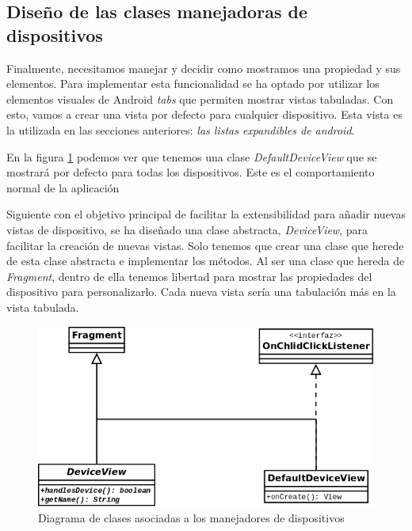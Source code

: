 \newpage
\subsection{Diseño de las clases manejadoras de dispositivos}

Finalmente, necesitamos manejar y decidir como mostramos una propiedad y sus elementos. Para implementar esta funcionalidad se ha optado por utilizar los elementos visuales de Android \textit{tabs} que permiten mostrar vistas tabuladas. Con esto, vamos a crear una vista por defecto para cualquier dispositivo. Esta vista es la utilizada en las secciones anteriores: \textit{las listas expandibles de android}.

\bigskip
En la figura \ref{fig:diag_manager_ui_device} podemos ver que tenemos una clase \textit{DefaultDeviceView} que se mostrará por defecto para todas los dispositivos. Este es el comportamiento normal de la aplicación

\bigskip
Siguiente con el objetivo principal de facilitar la extensibilidad para añadir nuevas vistas de dispositivo, se ha diseñado una clase abstracta, \textit{DeviceView}, para facilitar la creación de nuevas vistas. Solo tenemos que crear una clase que herede de esta clase abstracta e implementar los métodos. Al ser una clase que hereda de \textit{Fragment}, dentro de ella tenemos libertad para mostrar las propiedades del dispositivo para personalizarlo. Cada nueva vista sería una tabulación más en la vista tabulada.


\bigskip
\begin{figure}[!ht]
  \begin{center}
  \includegraphics[width=1\textwidth]{../images/device_ui.png}
  \caption{Diagrama de clases asociadas a los manejadores de dispositivos}
  \label{fig:diag_manager_ui_device}
  \end{center}
\end{figure}



